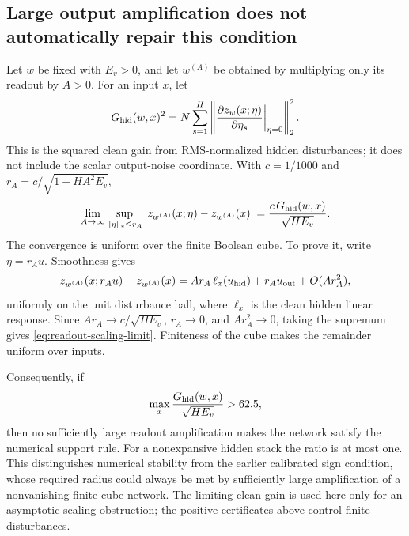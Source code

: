 \subsection{Large output amplification does not automatically repair this condition}

Let $w$ be fixed with $E_v>0$, and let $w^{(A)}$ be obtained by multiplying
only its readout by $A>0$.
For an input $x$, let
\[
 G_{\rm hid}(w,x)^2
  =N\sum_{s=1}^H
       \left\|\frac{\partial z_w(x;\eta)}{\partial\eta_s}
                     \bigg|_{\eta=0}\right\|_2^2.
\]
This is the squared clean gain from RMS-normalized hidden disturbances;
it does not include the scalar output-noise coordinate. With $c=1/1000$
and $r_A=c/\sqrt{1+H A^2E_v}$,
\begin{equation}\label{eq:readout-scaling-limit}
 \lim_{A\to\infty}
   \sup_{\|\eta\|_*\le r_A}
     |z_{w^{(A)}}(x;\eta)-z_{w^{(A)}}(x)|
   =\frac{c\,G_{\rm hid}(w,x)}{\sqrt{H E_v}}.
\end{equation}
The convergence is uniform over the finite Boolean cube.
To prove it, write $\eta=r_Au$. Smoothness gives
\[
 z_{w^{(A)}}(x;r_Au)-z_{w^{(A)}}(x)
   =A r_A\,\ell_x(u_{\rm hid})+r_Au_{\rm out}
                                      +O(A r_A^2),
\]
uniformly on the unit disturbance ball, where $\ell_x$ is the clean hidden
linear response. Since $A r_A\to c/\sqrt{HE_v}$,
$r_A\to0$, and $A r_A^2\to0$, taking the supremum gives
\eqref{eq:readout-scaling-limit}. Finiteness of the cube makes the remainder
uniform over inputs.

Consequently, if
\[
 \max_x\frac{G_{\rm hid}(w,x)}{\sqrt{H E_v}}>62.5,
\]
then no sufficiently large readout amplification makes the network satisfy
the numerical support rule. For a nonexpansive hidden stack the ratio is
at most one. This distinguishes numerical stability from the earlier
calibrated sign condition, whose required radius could always be met by
sufficiently large amplification of a nonvanishing finite-cube network.
The limiting clean gain is used here only for an asymptotic scaling
obstruction; the positive certificates above control finite disturbances.
